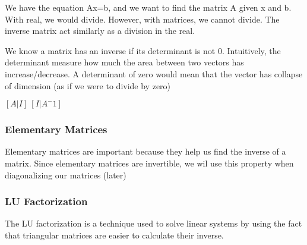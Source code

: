 \documentclass{article}
\begin{document}
\begin{remark}
    We have the equation Ax=b, and we want to find the matrix A given x and b.
    With real, we would divide. However, with matrices, we cannot divide. The
    inverse matrix act similarly as a division in the real.
\end{remark}

\begin{remark}
    We know a matrix has an inverse if its determinant is not 0. Intuitively,
    the determinant measure how much the area between two vectors has
    increase/decrease. A determinant of zero would mean that the vector has
    collapse of dimension (as if we were to divide by zero)
\end{remark}

\begin{definition}
\end{definition}

\begin{theorem}
\end{theorem}

\begin{theorem}
    $[A | I] ~ [I|A^-1]$
\end{theorem}

\begin{theorem}
\end{theorem}

\subsubsection{Elementary Matrices}

Elementary matrices are important because they help us find the inverse of a
matrix. Since elementary matrices are invertible, we wil use this property
when diagonalizing our matrices (later)

\begin{definition}
\end{definition}

\subsubsection{LU Factorization}

The LU factorization is a technique used to solve linear systems by using the
fact that triangular matrices are easier to calculate their inverse.
\end{document}
